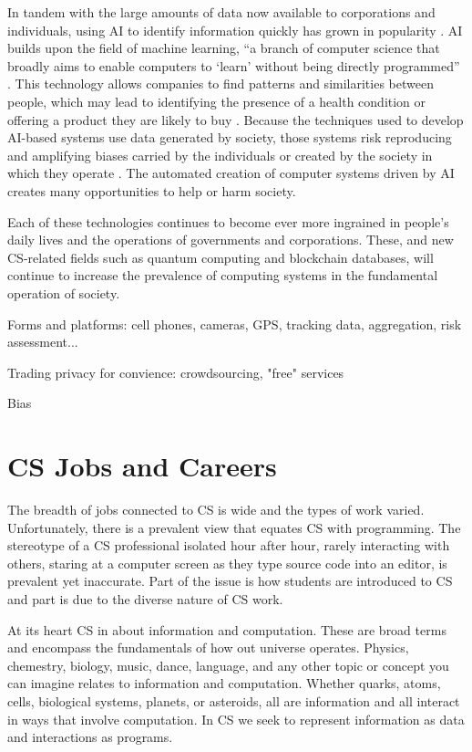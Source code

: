 In tandem with the large amounts of data now available to corporations and individuals, using AI to identify information quickly has grown in popularity \parencite{vinichenko_threats_2021}. AI builds upon the field of machine learning, “a branch of computer science that broadly aims to enable computers to ‘learn’ without being directly programmed” \parencite[p. 2222]{bi_what_2019}. This technology allows companies to find patterns and similarities between people, which may lead to identifying the presence of a health condition or offering a product they are likely to buy \parencite{fennelly_for_2021, ma_machine_2020}. Because the techniques used to develop AI-based systems use data generated by society, those systems risk reproducing and amplifying biases carried by the individuals or created by the society in which they operate \parencite{wiens_diagnosing_2020}. The automated creation of computer systems driven by AI creates many opportunities to help or harm society.

Each of these technologies continues to become ever more ingrained in people's daily lives and the operations of governments and corporations. These, and new CS-related fields such as quantum computing and blockchain databases, will continue to increase the prevalence of computing systems in the fundamental operation of society.



Forms and platforms: cell phones, cameras, GPS, tracking data, aggregation, risk assessment... 

Trading privacy for convience: crowdsourcing, "free" services

Bias


\section{CS Jobs and Careers}

The breadth of jobs connected to CS is wide and the types of work varied. Unfortunately, there is a prevalent view that equates CS with programming. The stereotype of a CS professional isolated hour after hour, rarely interacting with others, staring at a computer screen as they type source code into an editor, is prevalent yet inaccurate. Part of the issue is how students are introduced to CS and part is due to the diverse nature of CS work.

At its heart CS in about information and computation. These are broad terms and encompass the fundamentals of how out universe operates. Physics, chemestry, biology, music, dance, language, and any other topic or concept you can imagine relates to information and computation. Whether quarks, atoms, cells, biological systems, planets, or asteroids, all are information and all interact in ways that involve computation. In CS we seek to represent information as data and interactions as programs.

